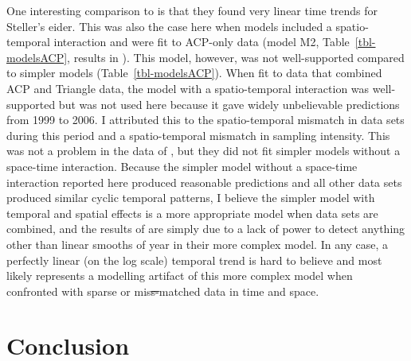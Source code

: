 \documentclass[
  10pt,
  letterpaper,
]{article}
\makeatletter
\providecommand{\DIFaddtex}[1]{{\protect\color{blue}\uwave{#1}}} %
\providecommand{\DIFdeltex}[1]{{\protect\color{red}\sout{#1}}} %
\providecommand{\DIFaddbegin}{} %
\providecommand{\DIFaddend}{} %
\providecommand{\DIFdelbegin}{} %
\providecommand{\DIFdelend}{} %
\providecommand{\DIFadd}[1]{\texorpdfstring{\DIFaddtex{#1}}{#1}} %
\providecommand{\DIFdel}[1]{\texorpdfstring{\DIFdeltex{#1}}{}} %
\providecommand{\DIFscaledelfig}{0.5}
\newlength{\DIFdelgraphicswidth} %
\newlength{\DIFdelgraphicsheight} %
\providecommand{\DIFaddincludegraphics}[2][]{{\color{blue}\fbox{\DIFOincludegraphics[#1]{#2}}}} %
\providecommand{\DIFdelincludegraphics}[2][]{%
\sbox{\DIFdelgraphicsbox}{\DIFOincludegraphics[#1]{#2}}%
\settoboxwidth{\DIFdelgraphicswidth}{\DIFdelgraphicsbox} %
\settoboxtotalheight{\DIFdelgraphicsheight}{\DIFdelgraphicsbox} %
\scalebox{\DIFscaledelfig}{%
\parbox[b]{\DIFdelgraphicswidth}{\usebox{\DIFdelgraphicsbox}\\[-\baselineskip] \rule{\DIFdelgraphicswidth}{0em}}\llap{\resizebox{\DIFdelgraphicswidth}{\DIFdelgraphicsheight}{%
\setlength{\unitlength}{\DIFdelgraphicswidth}%
\begin{picture}(1,1)%
\thicklines\linethickness{2pt} %
{\color[rgb]{1,0,0}\put(0,0){\framebox(1,1){}}}%
{\color[rgb]{1,0,0}\put(0,0){\line( 1,1){1}}}%
{\color[rgb]{1,0,0}\put(0,1){\line(1,-1){1}}}%
\end{picture}%
}\hspace*{3pt}}} %
} %
\DeclareRobustCommand{\DIFaddbegin}{\DIFOaddbegin \let\includegraphics\DIFaddincludegraphics} %
\DeclareRobustCommand{\DIFaddend}{\DIFOaddend \let\includegraphics\DIFOincludegraphics} %
\DeclareRobustCommand{\DIFdelbegin}{\DIFOdelbegin \let\includegraphics\DIFdelincludegraphics} %
\DeclareRobustCommand{\DIFdelend}{\DIFOaddend \let\includegraphics\DIFOincludegraphics} %
\let\sout@orig\sout %
\renewcommand{\sout}[1]{\ifmmode\text{\sout@orig{\ensuremath{#1}}}\else\sout@orig{#1}\fi} %
\makeatother
\begin{document}
One interesting comparison to \DIFaddbegin \DIFadd{Amundson et al. }\DIFaddend \citep{amundson2019} is that they found very linear time trends for Steller's eider. This was also the case here when models included a spatio-temporal interaction and were fit to ACP-only data (model M2, Table~\ref{tbl-modelsACP}, results in
). This model, however, was not well-supported
compared to simpler models (Table~\ref{tbl-modelsACP}). When fit to data
that combined ACP and Triangle data, the model with a spatio-temporal
interaction was well-supported but was not used here because it gave
widely unbelievable predictions from 1999 to 2006. I attributed this to
the spatio-temporal mismatch in data sets during this period and a
spatio-temporal mismatch in sampling intensity. This was not a problem
in the data of \citep{amundson2019}, but they did not fit simpler models
without a space-time interaction. Because the simpler model without a
space-time interaction reported here produced reasonable predictions and
all other data sets produced similar cyclic temporal patterns, I believe
the simpler model with temporal and spatial effects is a more
appropriate model when data sets are combined, and the results of
\citep{amundson2019} are simply due to a lack of power to detect
anything other than linear smooths of year in their more complex model.
In any case, a perfectly linear (on the log scale) temporal trend is
hard to believe and most likely represents a modelling artifact of this
more complex model when confronted with sparse or mis\DIFdelbegin \DIFdel{s-}\DIFdelend matched data in
time and space.

\section{Conclusion}\label{conclusion}
\end{document}
